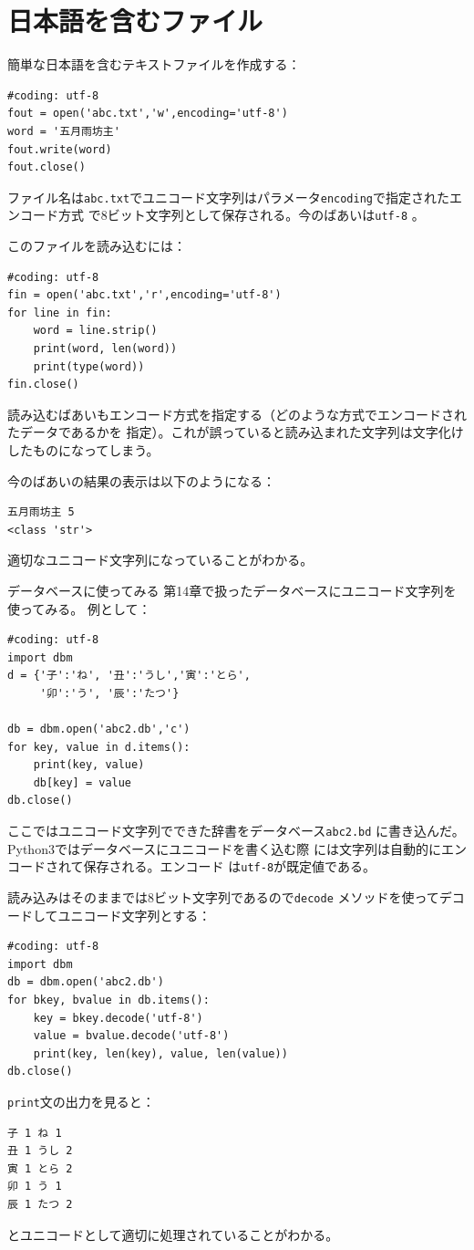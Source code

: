 \documentclass[a4j,12pt,makeidx]{jbook}
\begin{document}
\section{日本語を含むファイル}
簡単な日本語を含むテキストファイルを作成する：
\begin{verbatim}
#coding: utf-8
fout = open('abc.txt','w',encoding='utf-8')
word = '五月雨坊主'
fout.write(word)
fout.close()
\end{verbatim}
ファイル名は{\tt abc.txt}でユニコード文字列はパラメータ{\tt encoding}で指定されたエンコード方式
で8ビット文字列として保存される。今のばあいは{\tt utf-8} 。\par
このファイルを読み込むには：
\begin{verbatim}
#coding: utf-8
fin = open('abc.txt','r',encoding='utf-8')
for line in fin:
    word = line.strip()
    print(word, len(word))
    print(type(word))
fin.close()
\end{verbatim}
読み込むばあいもエンコード方式を指定する（どのような方式でエンコードされたデータであるかを
指定）。これが誤っていると読み込まれた文字列は文字化けしたものになってしまう。\par
今のばあいの結果の表示は以下のようになる：
\begin{verbatim}
五月雨坊主 5
<class 'str'>
\end{verbatim}
適切なユニコード文字列になっていることがわかる。\par
データベースに使ってみる
第14章で扱ったデータベースにユニコード文字列を使ってみる。
例として：
\begin{verbatim}
#coding: utf-8
import dbm
d = {'子':'ね', '丑':'うし','寅':'とら',
     '卯':'う', '辰':'たつ'}

db = dbm.open('abc2.db','c')
for key, value in d.items():
    print(key, value)
    db[key] = value
db.close()
\end{verbatim}
ここではユニコード文字列でできた辞書をデータベース{\tt abc2.bd}
に書き込んだ。Python3ではデータベースにユニコードを書く込む際
には文字列は自動的にエンコードされて保存される。エンコード
は{\tt utf-8}が既定値である。\par
読み込みはそのままでは8ビット文字列であるので{\tt decode}
メソッドを使ってデコードしてユニコード文字列とする：
\begin{verbatim}
#coding: utf-8
import dbm
db = dbm.open('abc2.db')
for bkey, bvalue in db.items():
    key = bkey.decode('utf-8')
    value = bvalue.decode('utf-8')
    print(key, len(key), value, len(value))
db.close()
\end{verbatim}
{\tt print}文の出力を見ると：
\begin{verbatim}
子 1 ね 1
丑 1 うし 2
寅 1 とら 2
卯 1 う 1
辰 1 たつ 2
\end{verbatim}
とユニコードとして適切に処理されていることがわかる。
%
\end{document}
